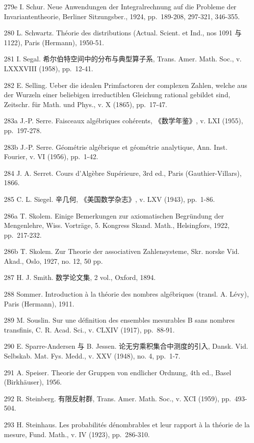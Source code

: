 279e I. Schur. Neue Anwendungen der Integralrechnung auf die Probleme der Invariantentheorie, Berliner Sitzungsber., 1924, pp.~189-208, 297-321, 346-355.

280 L. Schwartz. Théorie des distributions (Actual. Scient. et Ind., nos 1091 与 1122), Paris (Hermann), 1950-51.

281 I. Segal. 希尔伯特空间中的分布与典型算子系, Trans. Amer. Math. Soc., v. LXXXVIII (1958), pp.~12-41.

282 E. Selling. Ueber die idealen Primfactoren der complexen Zahlen, welche aus der Wurzeln einer beliebigen irreductiblen Gleichung rational gebildet sind, Zeitschr. für Math. und Phys., v. X (1865), pp.~17-47.

283a J.-P. Serre. Faisceaux algébriques cohérents, 《数学年鉴》, v. LXI (1955), pp.~197-278.

283b J.-P. Serre. Géométrie algébrique et géométrie analytique, Ann. Inst. Fourier, v. VI (1956), pp.~1-42.

284 J. A. Serret. Cours d'Algèbre Supérieure, 3rd ed., Paris (Gauthier-Villars), 1866.

285 C. L. Siegel. 辛几何, 《美国数学杂志》, v. LXV (1943), pp.~1-86.

286a T. Skolem. Einige Bemerkungen zur axiomatischen Begründung der Mengenlehre, Wiss. Vorträge, 5. Kongress Skand. Math., Helsingfors, 1922, pp.~217-232.

286b T. Skolem. Zur Theorie der associativen Zahlensysteme, Skr. norske Vid. Akad., Oslo, 1927, no. 12, 50 pp.

287 H. J. Smith. 数学论文集, 2 vol., Oxford, 1894.

288 Sommer. Introduction à la théorie des nombres algébriques (transl. A. Lévy), Paris (Hermann), 1911.

289 M. Souslin. Sur une définition des ensembles mesurables B sans nombres transfinis, C. R. Acad. Sci., v. CLXIV (1917), pp.~88-91.

290 E. Sparre-Andersen 与 B. Jessen. 论无穷乘积集合中测度的引入, Dansk. Vid. Selbskab. Mat. Fys. Medd., v. XXV (1948), no. 4, pp.~1-7.

291 A. Speiser. Theorie der Gruppen von endlicher Ordnung, 4th ed., Basel (Birkhäuser), 1956.

292 R. Steinberg. 有限反射群, Trans. Amer. Math. Soc., v. XCI (1959), pp.~493-504.

293 H. Steinhaus. Les probabilités dénombrables et leur rapport à la théorie de la mesure, Fund. Math., v. IV (1923), pp.~286-310.

